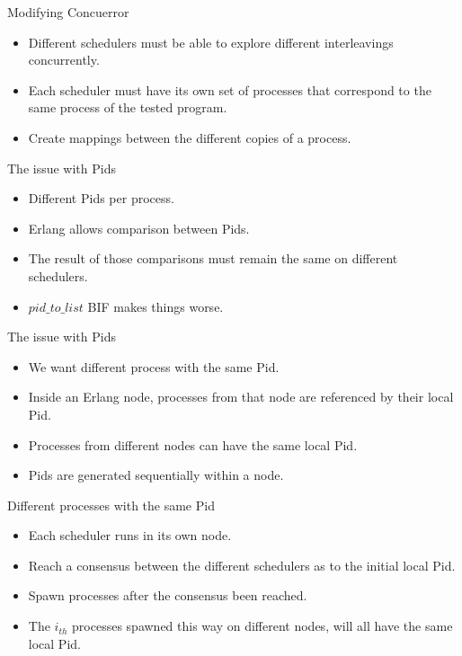 \documentclass[9pt]{beamer}
\begin{document}
\begin{frame} {Modifying Concuerror}

\begin{itemize}[<+->]
\item Different schedulers must be able to explore different interleavings concurrently.
\item Each scheduler must have its own set of processes that correspond to the same process of the tested program. 
\item Create mappings between the different copies of a process.
\end{itemize}

\end{frame}


\begin{frame} {The issue with Pids}


\begin{itemize}[<+->]
\item Different Pids per process.
\item Erlang allows comparison between Pids.
\item The result of those comparisons must remain the same on different schedulers. 
\item $pid\_to\_list$ BIF makes things worse.
\end{itemize}

\end{frame}

\begin{frame} {The issue with Pids}


\begin{itemize}[<+->]
\item We want different process with the same Pid.
\item Inside an Erlang node, processes from that node are referenced by their local Pid.
\item Processes from different nodes can have the same local Pid.
\item Pids are generated sequentially within a node.
\end{itemize}

\end{frame}

\begin{frame} {Different processes with the same Pid}


\begin{itemize}[<+->]
\item Each scheduler runs in its own node.
\item Reach a consensus between the different schedulers as to the initial local Pid.
\item Spawn processes after the consensus been reached.
\item The $i_{th}$ processes spawned this way on different nodes, will all have the same local Pid.
\end{itemize}

\end{frame}
\end{document}
